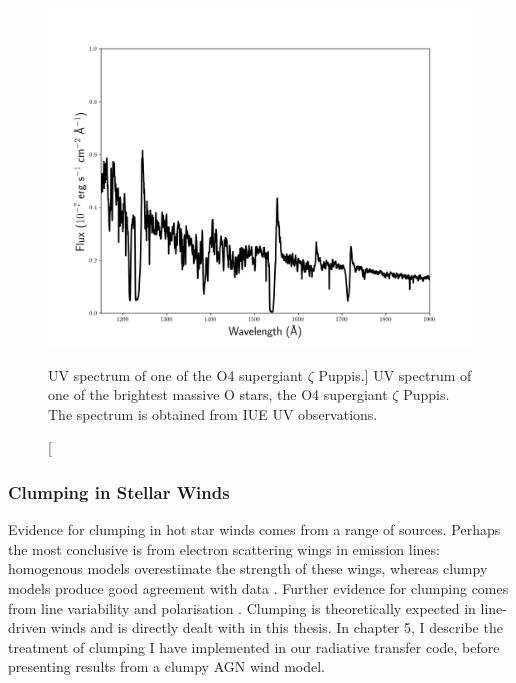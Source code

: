 \begin{figure}
\centering
\includegraphics[width=1.0\textwidth]{figures/02-outflows/zeta_pup.png}
\caption
[UV spectrum of one of the O4 supergiant $\zeta$ Puppis.]
{
UV spectrum of one of the brightest massive O stars, 
the O4 supergiant $\zeta$ Puppis. The spectrum is obtained from 
IUE UV observations.
} 
\label{fig:hot_star_wind}
\end{figure}

\subsubsection{Clumping in Stellar Winds}

\label{sec:clumpy_stellar}
Evidence for clumping in hot star winds comes from a range of sources.
Perhaps the most conclusive is from electron scattering wings
in emission lines: homogenous models overestimate the strength of these
wings, whereas clumpy models produce good agreement with data 
\citep{hillier1984,hillier1991eswingsmodel,hamann1992wr,hamann1994,schmutz1997}.
Further evidence for clumping comes from line variability \citep{prinja1992}
and polarisation \citep{brown1995}. Clumping is theoretically expected
in line-driven winds 
\citep[see section~\ref{sec:line_driving} and the review by][]{owocki2014} 
and is directly dealt with in this thesis.
In chapter 5, I describe the treatment of clumping I have implemented 
in our radiative transfer code, before presenting
results from a clumpy AGN wind model.

